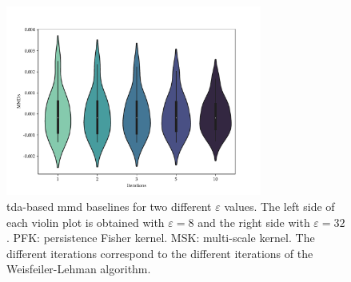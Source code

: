 \begin{figure}
  \centering
  \includegraphics[width=0.75\textwidth]{./figures/results/wl_baselines.pdf}
  \caption[Weisfeiler-Lehman-based \acrshort{mmd} baselines for two different
$\varepsilon$ values.]{\acrshort{tda}-based \acrshort{mmd} baselines for two
different $\varepsilon$ values. The left side of each violin plot is obtained
with $\varepsilon=8$ and the right side with $\varepsilon=32$. PFK: persistence
Fisher kernel. MSK: multi-scale kernel. The different iterations correspond to
the different iterations of the Weisfeiler-Lehman algorithm.}
\end{figure}
